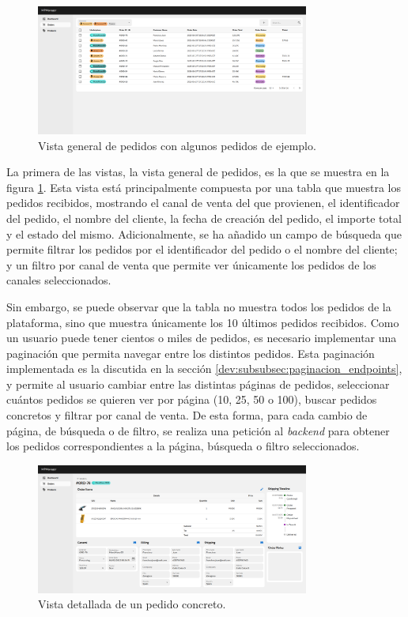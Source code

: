 \begin{figure}
    \centering
    \includegraphics[width=0.8\textwidth]{figures/design_develop/screenshots/tabla_pedidos.png}
    \caption{Vista general de pedidos con algunos pedidos de ejemplo.}
    \label{fig:dev:ss:vista_general_pedidos}
\end{figure}

La primera de las vistas, la vista general de pedidos, es la que se muestra en la figura \ref{fig:dev:ss:vista_general_pedidos}. Esta vista está principalmente compuesta por una tabla que muestra los pedidos recibidos, mostrando el canal de venta del que provienen, el identificador del pedido, el nombre del cliente, la fecha de creación del pedido, el importe total y el estado del mismo. Adicionalmente, se ha añadido un campo de búsqueda que permite filtrar los pedidos por el identificador del pedido o el nombre del cliente; y un filtro por canal de venta que permite ver únicamente los pedidos de los canales seleccionados.

Sin embargo, se puede observar que la tabla no muestra todos los pedidos de la plataforma, sino que muestra únicamente los 10 últimos pedidos recibidos. Como un usuario puede tener cientos o miles de pedidos, es necesario implementar una paginación que permita navegar entre los distintos pedidos. Esta paginación implementada es la discutida en la sección \ref{dev:subsubsec:paginacion_endpoints}, y permite al usuario cambiar entre las distintas páginas de pedidos, seleccionar cuántos pedidos se quieren ver por página (10, 25, 50 o 100), buscar pedidos concretos y filtrar por canal de venta. De esta forma, para cada cambio de página, de búsqueda o de filtro, se realiza una petición al \textit{backend} para obtener los pedidos correspondientes a la página, búsqueda o filtro seleccionados.

\begin{figure}
    \centering
    \includegraphics[width=0.8\textwidth]{figures/design_develop/screenshots/detalle_pedidos.png}
    \caption{Vista detallada de un pedido concreto.}
    \label{fig:dev:ss:vista_detallada_pedidos}
\end{figure}

